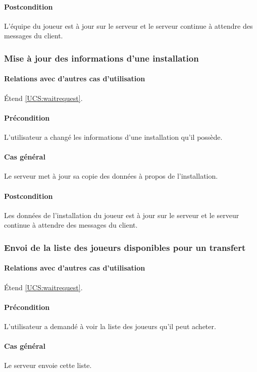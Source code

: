     \paragraph{Postcondition} L'équipe du joueur est à jour sur le serveur et le serveur continue à attendre des messages du \gls{client}.

\subsubsection{Mise à jour des informations d'une installation}
	\label{UCS:updateinstallation}
	\paragraph{Relations avec d'autres cas d'utilisation} \'Etend \ref{UCS:waitrequest}.
	\paragraph{Précondition} L'utilisateur a changé les informations d'une installation qu'il possède.
    \paragraph{Cas général} Le \gls{serveur} met à jour sa copie des données à propos de l'installation.
    \paragraph{Postcondition} Les données de l'installation du joueur est à jour sur le serveur et le serveur continue à attendre des messages du \gls{client}.
    
\subsubsection{Envoi de la liste des joueurs disponibles pour un transfert}
	\label{UCS:sendtransfers}
	\paragraph{Relations avec d'autres cas d'utilisation} \'Etend \ref{UCS:waitrequest}.
	\paragraph{Précondition} L'utilisateur a demandé à voir la liste des joueurs qu'il peut acheter.
    \paragraph{Cas général} Le \gls{serveur} envoie cette liste.
